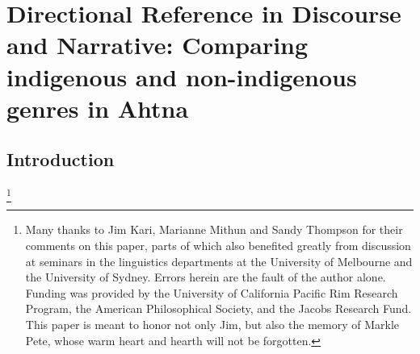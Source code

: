 \chapter[Directional Reference in Discourse and Narrative]{\vspace{-25pt}Directional Reference in Discourse and Narrative: Comparing indigenous and non-indigenous genres in Ahtna}





\def\authorlast{Berez-Kroeker}

\renewcommand{\beginchapter}{\pageref{berez-ch-begin}}
\renewcommand{\finishchapter}{\pageref{berez-ch-end}}
\label{berez-ch-begin}



\thispagestyle{firststyle}





\section{Introduction}\hspace{-0.3cm}\footnote{Many thanks to Jim Kari, Marianne Mithun and Sandy Thompson for their comments on this paper, parts of which also benefited greatly from discussion at seminars in the linguistics departments at the University of Melbourne and the University of Sydney. Errors herein are the fault of the author alone. Funding was provided by the University of California Pacific Rim Research Program, the American Philosophical Society, and the Jacobs Research Fund. This paper is meant to honor not only Jim, but also the memory of Markle Pete, whose warm heart and hearth will not be forgotten.}

